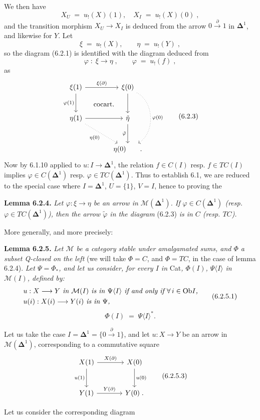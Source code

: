 \documentclass[11pt]{article}
\newcommand{\printedpage}[1]{\marginpar{\footnotesize p.~#1}}
\newcommand{\msp}[1]{\marginpar{\footnotesize [#1]}}
\newcommand{\Dl}{\boldsymbol{\Delta}}
\newcommand{\Ob}{\mathrm{Ob}}
\begin{document}
\msp{page 106}
We then have
\[
X_U \;=\; u_!(X)(1), \quad X_I \;=\; u_!(X)(0)\;,
\]
and the transition morphism $X_U \longrightarrow X_I$ is deduced from the arrow $0 \xrightarrow{\ \partial\ } 1$ in $\Dl^1$, and likewise for $Y$. Let
\[
\xi \;=\; u_!(X), \qquad \eta \;=\; u_!(Y)\;,
\]
\printedpage{53}
so the diagram (6.2.1) is identified with the diagram deduced from
\[
\varphi \;:\; \xi \longrightarrow \eta\;, \qquad \varphi \;=\; u_!(f)\;,
\]
as
\[
\begin{tikzcd}[row sep=large, column sep=large]
\xi(1) \arrow[r, "\xi(\partial)"] \arrow[d, "\varphi(1)"'] \arrow[dr, phantom, "\text{cocart.}"] & \xi(0) \arrow[d] \arrow[dd, dotted, bend left=60, "\varphi(0)"] \\
\eta(1) \arrow[r] \arrow[dr, dotted, "\eta(0)"'] & \tilde{\eta} \arrow[d, "\tilde{\varphi}"'] \\
 & \eta(0) \qquad .
\end{tikzcd}
\tag*{(6.2.3)}
\]
Now by 6.1.10 applied to $u : I \longrightarrow \Dl^1$, the relation $f \in C(I)$ resp. $f \in TC(I)$ implies $\varphi \in C(\Dl^1)$ resp. $\varphi \in TC(\Dl^1)$. Thus to establish 6.1, we are reduced to the special case where $I = \Dl^1$, $U = \{1\}$, $V = I$, hence to proving the

\textbf{Lemma 6.2.4.} \textit{Let $\varphi : \xi \longrightarrow \eta$ be an arrow in $\mathcal{M}(\Dl^1)$. If $\varphi \in C(\Dl^1)$ (resp.}
\msp{page 107}
\textit{$\varphi \in TC(\Dl^1)$), then the arrow $\tilde{\varphi}$ in the diagram} (6.2.3) \textit{is in $C$ (resp. $TC$).}

More generally, and more precisely:

\textbf{Lemma 6.2.5.} \textit{Let $\mathcal{M}$ be a category stable under amalgamated sums, and $\Phi$ a subset Q-closed on the left} (we will take $\Phi = C$, and $\Phi = TC$, in the case of lemma 6.2.4). \textit{Let $\Psi = \Phi_{*}$, and let us consider, for every $I$ in} Cat\textit{, $\Phi(I)$, $\Psi\langle I\rangle$ in $\mathcal{M}(I)$, defined by:}
\[
\begin{aligned}
&\text{\textit{$u : X \longrightarrow Y$ in $\mathcal{M}(I)$ is in $\Psi\langle I\rangle$ if and only if $\forall\, i \in \Ob I$,}}\\
&\text{\textit{$u(i) : X(i) \longrightarrow Y(i)$ is in $\Psi$,}}
\end{aligned}
\tag*{(6.2.5.1)}
\]
\[
\Phi(I) \;=\; \Psi\langle I\rangle^{*}.
\tag*{(6.2.5.2)}
\]

Let us take the case $I = \Dl^1 = \{0 \xrightarrow{\ \partial\ } 1\}$, and let $u : X \longrightarrow Y$ be an arrow in $\mathcal{M}(\Dl^1)$, corresponding to a commutative square
\[
\begin{tikzcd}[row sep=large, column sep=large]
X(1) \arrow[r, "X(\partial)"] \arrow[d, "u(1)"'] & X(0) \arrow[d, "u(0)"] \\
Y(1) \arrow[r, "Y(\partial)"] & Y(0)\;.
\end{tikzcd}
\tag*{(6.2.5.3)}
\]

Let us consider the corresponding diagram
\end{document}
